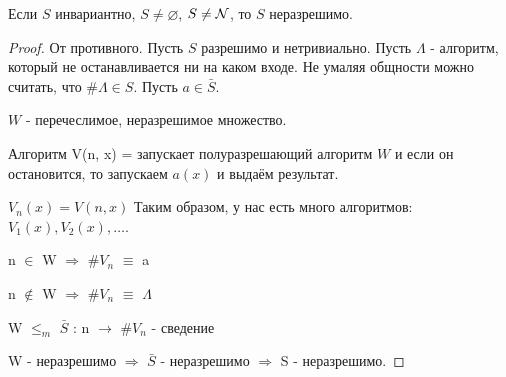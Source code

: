 \begin{theorem}
	Если $S$ инвариантно, $S \ne \varnothing$, $S \ne \mathcal{N}$, то $S$ неразрешимо.
\end{theorem}
\begin{proof}
	От противного.
	Пусть $S$ разрешимо и нетривиально.
	Пусть $\Lambda$ - алгоритм, который не останавливается ни на каком входе.
	Не умаляя общности можно считать, что $\#\Lambda \in S$.
	Пусть $a \in \bar{S}$.

	$W$ - перечеслимое, неразрешимое множество.

	Алгоритм V(n, x) = запускает полуразрешающий алгоритм $W$ и если он остановится, то запускаем $a(x)$ и выдаём результат.

	$V_n(x) = V(n, x)$ Таким образом, у нас есть много алгоритмов: $V_1(x), V_2(x), \dots$.

	n $\in$ W $\Rightarrow$ \#$V_n$ $\equiv$ a

	n $\notin$ W $\Rightarrow$ \#$V_n$ $\equiv$ $\Lambda$

	W $\le_m$ $\bar{S}$ : n $\longrightarrow$ \#$V_n$ - сведение

	W - неразрешимо $\Rightarrow$ $\bar{S}$ - неразрешимо $\Rightarrow$  S - неразрешимо.
\end{proof}

